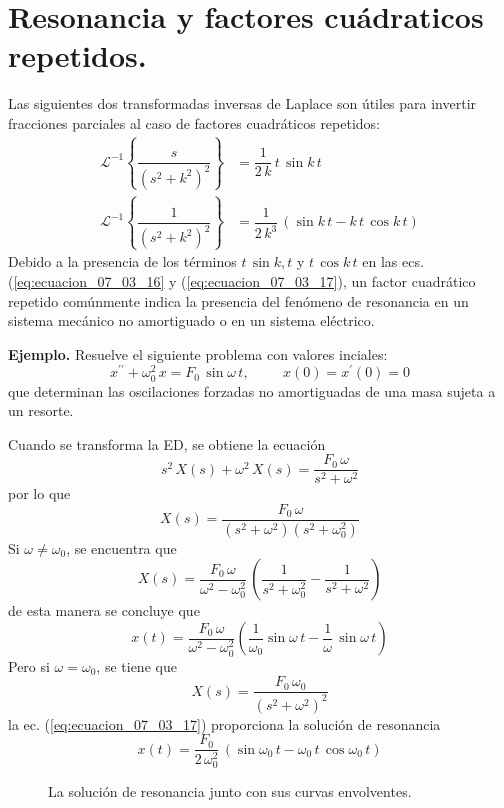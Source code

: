 \section{Resonancia y factores cuádraticos repetidos.}
Las siguientes dos transformadas inversas de Laplace son útiles para invertir fracciones parciales al caso de factores cuadráticos repetidos:
\begin{align}
\mathscr{L}^{-1} \left\{ \dfrac{s}{(s^{2} + k^{2})^{2}} \right\} &= \dfrac{1}{2 \, k} \, t \, \sin k \, t \label{eq:ecuacion_07_03_16} \\
\mathscr{L}^{-1} \left\{ \dfrac{1}{(s^{2} + k^{2})^{2}} \right\} &= \dfrac{1}{2 \, k^{3}} \, (\sin k \, t - k \, t \, \cos k \, t) \label{eq:ecuacion_07_03_17}
\end{align}
Debido a la presencia de los términos $t \, \sin k , t$ y $t \, \cos k \, t$ en las ecs. (\ref{eq:ecuacion_07_03_16} y (\ref{eq:ecuacion_07_03_17}), un factor cuadrático repetido comúnmente indica la presencia del fenómeno de resonancia en un sistema mecánico no amortiguado o en un sistema eléctrico.
\par
\textbf{Ejemplo.}
Resuelve el siguiente problema con valores inciales:
\[ x^{\prime \prime} + \omega_{0}^{2} \, x = F_{0} \, \sin \omega \, t, \hspace{1cm} x(0) = x^{\prime}(0) = 0 \]
que determinan las oscilaciones forzadas no amortiguadas de una masa sujeta a un resorte.
\par
Cuando se transforma la ED, se obtiene la ecuación
\[ s^{2} \, X(s) + \omega^{2} \, X(s) = \dfrac{F_{0} \, \omega}{s^{2} + \omega^{2}} \]
por lo que
\[  X(s) = \dfrac{F_{0} \, \omega}{(s^{2} + \omega^{2})(s^{2} + \omega_{0}^{2})} \]
Si $\omega \neq \omega_{0}$, se encuentra que
\[ X(s) = \dfrac{F_{0} \, \omega}{\omega^{2} - \omega_{0}^{2}} \, \left( \dfrac{1}{s^{2}+ \omega_{0}^{2}} - \dfrac{1}{s^{2} + \omega^{2}} \right) \]
de esta manera se concluye que
\[ x(t) = \dfrac{F_{0} \, \omega}{\omega^{2} - \omega_{0}^{2}} \left( \dfrac{1}{\omega_{0}} \sin \omega \, t - \dfrac{1}{\omega} \, \sin \omega \, t \right) \]
Pero si $\omega = \omega_{0}$, se tiene que
\[ X(s) = \dfrac{F_{0} \, \omega_{0}}{(s^{2} + \omega^{2})^{2}} \]
la ec. (\ref{eq:ecuacion_07_03_17}) proporciona la solución de resonancia
\begin{equation}
x(t) = \dfrac{F_{0}}{2 \, \omega_{0}^{2}} \, (\sin \omega_{0} \, t - \omega_{0} \, t \, \cos \omega_{0} \, t )
\label{eq:ecuacion_07_03_18}
\end{equation}
\begin{figure}[H]
    \centering
    
    \caption{La solución de resonancia junto con sus curvas envolventes.}
    \label{fig_figura_011}
\end{figure}
